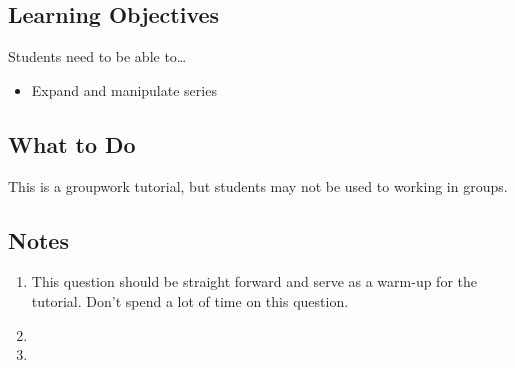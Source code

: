 \subsection*{Learning Objectives} Students need to be able to\ldots
	\begin{itemize}
		\item Expand and manipulate series
	\end{itemize}

\subsection*{What to Do} This is a groupwork tutorial,
	but students may not be used to working in groups.

\subsection*{Notes}
		\begin{enumerate}
			\item This question should be straight forward and serve
				as a warm-up for the tutorial. Don't spend a lot
				of time on this question.
			\item 
			\item 
		\end{enumerate}
